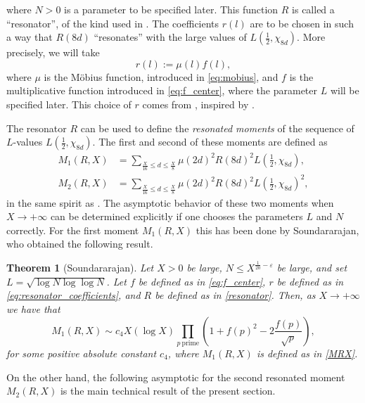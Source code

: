 \documentclass[10pt,a4paper]{amsart}
\theoremstyle{plain}
\newtheorem{theorem}{Theorem}[section]
\theoremstyle{definition}
\theoremstyle{remark}
\begin{document}
     where $N > 0$ is a parameter to be specified later. This function $R$ is called a ``resonator'', of the kind used in \cite{Soundararajan_2008}. 
The coefficients $r(l)$ are to be chosen in such a way that $R(8d)$ ``resonates'' with the large values of $L\left(\frac{1}{2},\chi_{8d}\right)$. 
More precisely, we will take 
\begin{equation} \label{eq:resonator_coefficients}
    r(l) := \mu(l) f(l),    
\end{equation}
where $\mu$ is the M\"obius function, introduced in \eqref{eq:mobius}, and $f$ is the multiplicative function introduced in \eqref{eq:f_center}, where the parameter $L$ will be specified later. This choice of $r$ comes from \cite[Proposition 3.3]{Soundararajan_2008}, inspired by \cite[Theorem 2.1]{Soundararajan_2008}. 

The resonator $R$ can be used to define the \textit{resonated moments} of the sequence of $L$-values $L\left(\frac{1}{2},\chi_{8d}\right)$. The first and second of these moments are defined as
\begin{align}
    M_1(R,X) &= \sum_{\frac{X}{16}\leq d\leq \frac{X}{8}}\mu(2d)^2R(8d)^2L\left(\frac{1}{2},\chi_{8d}\right), \label{MRX} \\
    M_2(R,X) &= \sum_{\frac{X}{16}\leq d\leq \frac{X}{8}} \mu(2d)^2 R(8d)^2 L\left(\frac{1}{2},\chi_{8d}\right)^2,\label{M2RX}
\end{align}
in the same spirit as \cite[Section 3]{Soundararajan_2008}. 
The asymptotic behavior of these two moments when $X \to +\infty$ can be determined explicitly if one chooses the parameters $L$ and $N$ correctly. For the first moment $M_1(R,X)$ this has been done by Soundararajan, who obtained the following result.  

\begin{theorem}[Soundararajan]
\label{FirstMoment} 
Let $X > 0$ be large, $N\leq X^{\frac{1}{20}-\varepsilon}$ be large, and set $L=\sqrt{\log N\log\log N}$. Let $f$ be defined as in \eqref{eq:f_center}, $r$ be defined as in \eqref{eq:resonator_coefficients}, and $R$ be defined as in \eqref{resonator}. Then, as $X \to +\infty$ we have that
\begin{equation}
M_1(R,X)\sim c_4 X(\log X)\prod_{p \ \text{prime}}\left(1+f(p)^2-2\frac{f(p)}{\sqrt{p}}\right),
\end{equation}
for some positive absolute constant $c_4$, where $M_1(R,X)$ is defined as in \eqref{MRX}.
\end{theorem}

On the other hand, the following asymptotic for the second resonated moment $M_2(R,X)$ is the main technical result of the present section.
\end{document}
